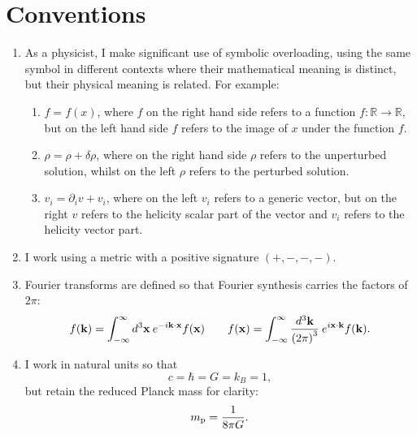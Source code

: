 \chapter*{Conventions}
\label{sec:cos:conventions}


\begin{enumerate}
  \item As a physicist, I make significant use of symbolic overloading, using the same symbol in different contexts where their mathematical meaning is distinct, but their physical meaning is related. For example:
    \begin{enumerate}
      \item $f=f(x)$, where $f$ on the right hand side refers to a function ${f:\mathbb{R}\to\mathbb{R}}$, but on the left hand side $f$ refers to the image of $x$ under the function $f$.
      \item $\rho = \rho + \delta\rho$, where on the right hand side $\rho$ refers to the unperturbed solution, whilst on the left $\rho$ refers to the perturbed solution.
      \item $v_i = \partial_i v + v_i$, where on the left $v_i$ refers to a generic vector, but on the right $v$ refers to the helicity scalar part of the vector and $v_i$ refers to the helicity vector part.
    \end{enumerate}
  \item I work using a metric with a positive signature $(+,-,-,-)$.
  \item Fourier transforms are defined so that Fourier synthesis carries the factors of $2\pi$:
    \begin{equation}
      f(\mathbf{k}) = \int_{-\infty}^{\infty} d^3\mathbf{x}\: e^{-i \mathbf{k}\cdot\mathbf{x}} f(\mathbf{x}) \qquad f(\mathbf{x}) = \int_{-\infty}^{\infty} \frac{d^3\mathbf{k}}{{(2\pi)}^3}\: e^{i \mathbf{x}\cdot\mathbf{k}} f(\mathbf{k}).
      \label{eqn:cos:fourier_transform}
    \end{equation}
  \item I work in natural units so that 
    \begin{equation}
      c = \hbar = G = k_B = 1,
      \label{eqn:cos:natural_units}
    \end{equation}
    but retain the reduced Planck mass for clarity:
    \begin{equation}
      m_{\mathrm{p}} = \frac{1}{8\pi G}.
      \label{eqn:cos:reduced_planck_mass}
    \end{equation}
\end{enumerate}

\cleardoublepage{}
